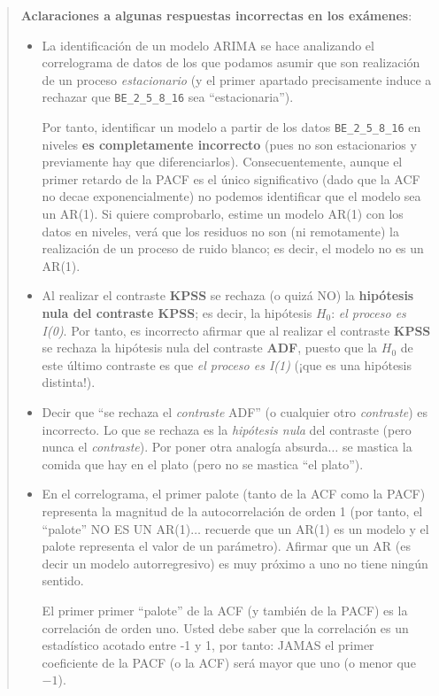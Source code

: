 \documentclass[10pt]{article}
\begin{document}
\begin{quote}
\textbf{Aclaraciones a algunas respuestas incorrectas en los exámenes}:

\begin{itemize}
\item La identificación de un modelo ARIMA se hace analizando el
correlograma de datos de los que podamos asumir que son realización
de un proceso \emph{estacionario} (y el primer apartado precisamente
induce a rechazar que \texttt{BE\_2\_5\_8\_16} sea ``estacionaria'').

Por tanto, identificar un modelo a partir de los datos \texttt{BE\_2\_5\_8\_16}
en niveles \textbf{es completamente incorrecto} (pues no son estacionarios
y previamente hay que diferenciarlos). Consecuentemente, aunque el
primer retardo de la PACF es el único significativo (dado que la ACF
no decae exponencialmente) no podemos identificar que el modelo sea
un AR(1). Si quiere comprobarlo, estime un modelo AR(1) con los
datos en niveles, verá que los residuos no son (ni remotamente) la
realización de un proceso de ruido blanco; es decir, el modelo no es
un AR(1).
\end{itemize}


\begin{itemize}
\item Al realizar el contraste \textbf{KPSS} se rechaza (o quizá NO) la
\textbf{hipótesis nula del contraste KPSS}; es decir, la hipótesis \(H_0\):
\emph{el proceso es I(0)}. Por tanto, es incorrecto afirmar que al
realizar el contraste \textbf{KPSS} se rechaza la hipótesis nula del
contraste \textbf{ADF}, puesto que la \(H_0\) de este último contraste es que
\emph{el proceso es I(1)} (¡que es una hipótesis distinta!).
\end{itemize}


\begin{itemize}
\item Decir que ``se rechaza el \emph{contraste} ADF'' (o cualquier otro
\emph{contraste}) es incorrecto. Lo que se rechaza es la \emph{hipótesis nula}
del contraste (pero nunca el \emph{contraste}). Por poner otra analogía
absurda\(\ldots{}\) se mastica la comida que hay en el plato (pero no
se mastica ``el plato'').
\end{itemize}


\begin{itemize}
\item En el correlograma, el primer palote (tanto de la ACF como la PACF)
representa la magnitud de la autocorrelación de orden 1 (por tanto,
el ``palote'' NO ES UN AR(1)\(\ldots{}\) recuerde que un AR(1) es un
modelo y el palote representa el valor de un parámetro). Afirmar que
un AR (es decir un modelo autorregresivo) es muy próximo a uno no
tiene ningún sentido.

El primer primer ``palote'' de la ACF (y también de la PACF) es la
correlación de orden uno. Usted debe saber que la correlación es un
estadístico acotado entre -1 y 1, por tanto: JAMAS el primer
coeficiente de la PACF (o la ACF) será mayor que uno (o menor que
\(-1\)).
\end{itemize}
\end{quote}
\end{document}
